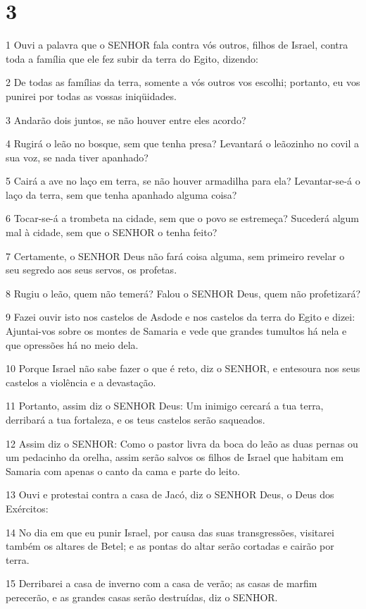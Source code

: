 \chapter{3}

\par 1 Ouvi a palavra que o SENHOR fala contra vós outros, filhos de Israel, contra toda a família que ele fez subir da terra do Egito, dizendo:
\par 2 De todas as famílias da terra, somente a vós outros vos escolhi; portanto, eu vos punirei por todas as vossas iniqüidades.
\par 3 Andarão dois juntos, se não houver entre eles acordo?
\par 4 Rugirá o leão no bosque, sem que tenha presa? Levantará o leãozinho no covil a sua voz, se nada tiver apanhado?
\par 5 Cairá a ave no laço em terra, se não houver armadilha para ela? Levantar-se-á o laço da terra, sem que tenha apanhado alguma coisa?
\par 6 Tocar-se-á a trombeta na cidade, sem que o povo se estremeça? Sucederá algum mal à cidade, sem que o SENHOR o tenha feito?
\par 7 Certamente, o SENHOR Deus não fará coisa alguma, sem primeiro revelar o seu segredo aos seus servos, os profetas.
\par 8 Rugiu o leão, quem não temerá? Falou o SENHOR Deus, quem não profetizará?
\par 9 Fazei ouvir isto nos castelos de Asdode e nos castelos da terra do Egito e dizei: Ajuntai-vos sobre os montes de Samaria e vede que grandes tumultos há nela e que opressões há no meio dela.
\par 10 Porque Israel não sabe fazer o que é reto, diz o SENHOR, e entesoura nos seus castelos a violência e a devastação.
\par 11 Portanto, assim diz o SENHOR Deus: Um inimigo cercará a tua terra, derribará a tua fortaleza, e os teus castelos serão saqueados.
\par 12 Assim diz o SENHOR: Como o pastor livra da boca do leão as duas pernas ou um pedacinho da orelha, assim serão salvos os filhos de Israel que habitam em Samaria com apenas o canto da cama e parte do leito.
\par 13 Ouvi e protestai contra a casa de Jacó, diz o SENHOR Deus, o Deus dos Exércitos:
\par 14 No dia em que eu punir Israel, por causa das suas transgressões, visitarei também os altares de Betel; e as pontas do altar serão cortadas e cairão por terra.
\par 15 Derribarei a casa de inverno com a casa de verão; as casas de marfim perecerão, e as grandes casas serão destruídas, diz o SENHOR.

